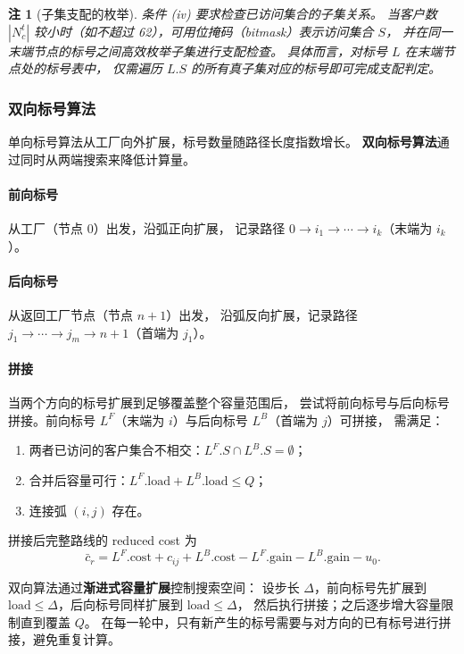 \documentclass{article}
\newtheorem{remark}{注}
\begin{document}
\begin{remark}[子集支配的枚举]
条件 (iv) 要求检查已访问集合的子集关系。
当客户数 $|N_c^t|$ 较小时（如不超过 62），可用位掩码（bitmask）表示访问集合 $S$，
并在同一末端节点的标号之间高效枚举子集进行支配检查。
具体而言，对标号 $L$ 在末端节点处的标号表中，
仅需遍历 $L.S$ 的所有真子集对应的标号即可完成支配判定。
\end{remark}

\subsubsection{双向标号算法}
\label{sec:bidirectional}

单向标号算法从工厂向外扩展，标号数量随路径长度指数增长。
\textbf{双向标号算法}通过同时从两端搜索来降低计算量。

\paragraph{前向标号}从工厂（节点 $0$）出发，沿弧正向扩展，
记录路径 $0 \to i_1 \to \cdots \to i_k$（末端为 $i_k$）。

\paragraph{后向标号}从返回工厂节点（节点 $n+1$）出发，
沿弧反向扩展，记录路径 $j_1 \to \cdots \to j_m \to n+1$（首端为 $j_1$）。

\paragraph{拼接}当两个方向的标号扩展到足够覆盖整个容量范围后，
尝试将前向标号与后向标号拼接。前向标号 $L^F$（末端为 $i$）与后向标号 $L^B$（首端为 $j$）可拼接，
需满足：
\begin{enumerate}[label=(\roman*)]
  \item 两者已访问的客户集合不相交：$L^F.S \cap L^B.S = \emptyset$；
  \item 合并后容量可行：$L^F.\text{load} + L^B.\text{load} \le Q$；
  \item 连接弧 $(i,j)$ 存在。
\end{enumerate}
拼接后完整路线的 reduced cost 为
\begin{equation}
\bar{c}_r = L^F.\text{cost} + c_{ij} + L^B.\text{cost} - L^F.\text{gain} - L^B.\text{gain} - u_0.
\end{equation}

双向算法通过\textbf{渐进式容量扩展}控制搜索空间：
设步长 $\Delta$，前向标号先扩展到 $\text{load} \le \Delta$，后向标号同样扩展到 $\text{load} \le \Delta$，
然后执行拼接；之后逐步增大容量限制直到覆盖 $Q$。
在每一轮中，只有新产生的标号需要与对方向的已有标号进行拼接，避免重复计算。
\end{document}
